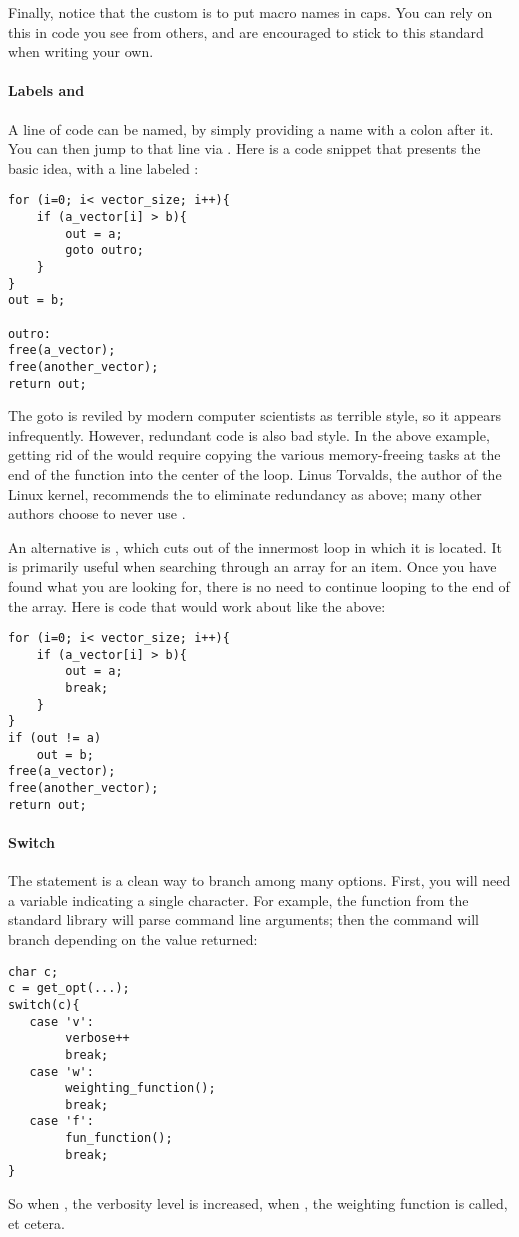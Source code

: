 Finally, notice that the custom is to put macro names in caps.  You can
rely on this in code you see from others, and are encouraged to stick
to this standard when writing your own.

\paragraph{Labels and } A line of code can be named, by simply providing a
name with a colon after it. You can then jump to that line via . Here is a code snippet that presents the basic idea, with a line labeled :
\begin{lstlisting}
for (i=0; i< vector_size; i++){
    if (a_vector[i] > b){
        out = a;
        goto outro;
    }
}
out = b;

outro:
free(a_vector);
free(another_vector);
return out;
\end{lstlisting}
The goto is reviled by modern computer scientists as terrible style, so
it appears infrequently. However, redundant code is also bad style. 
In the above example, getting rid of the  would require copying
the various memory-freeing tasks at the end of the function into the
center of the  loop.  Linus Torvalds,
the author of the Linux kernel, recommends the  to eliminate
redundancy as above; many other authors choose to never use .

An alternative is , which cuts out of the innermost loop in
which it is located. It is primarily useful when searching through an
array for an item. Once you have found what you are looking for, there
is no need to continue looping to the end of the array.
Here is code that would work about like the above:
\begin{lstlisting}
for (i=0; i< vector_size; i++){
    if (a_vector[i] > b){
        out = a;
        break;
    }
}
if (out != a)
    out = b;
free(a_vector);
free(another_vector);
return out;
\end{lstlisting}

\paragraph{Switch} The  statement is a clean way to
branch among many options. First, you will need a variable indicating
a single character. For example, the  function from the
standard library will parse command line arguments; then the 
command will branch depending on the value returned:
\begin{lstlisting}
char c;
c = get_opt(...);
switch(c){
   case 'v':
        verbose++
        break;
   case 'w':    
        weighting_function();
        break;
   case 'f':      
        fun_function();
        break;
}
\end{lstlisting}
So when 
, the verbosity level is increased,
when , the weighting function is called, 
et cetera.

